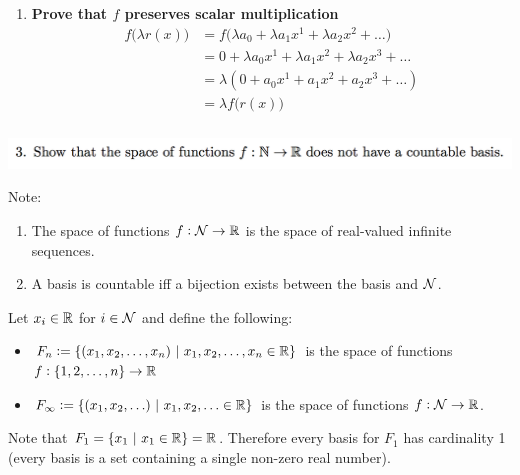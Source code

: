 \begin{enumerate}
\item \textbf{Prove that $f$ preserves scalar multiplication}
  \begin{align*}
    f\Big(\lambda r(x)\Big)
    &= f\Big(\lambda a_0 + \lambda a_1x^1 + \lambda a_2x^2 + \ldots \Big) \\
    &= 0 + \lambda a_0x^1 + \lambda a_1x^2 + \lambda a_2x^3 + \ldots \\
    &= \lambda(0 + a_0x^1 + a_1x^2 + a_2x^3 + \ldots) \\
    &= \lambda f\Big(r(x)\Big)
  \end{align*}


\end{enumerate}

\newpage
\subsubsection{} %
\begin{mdframed}
  \includegraphics[width=400pt]{img/linear-algebra-a0-1-3.png}\\
\end{mdframed}

Note:
\begin{enumerate}
\item The space of functions $f:\mathcal{N} \to \mathbb{R}$ is the space of real-valued
  infinite sequences.
\item A basis is countable iff a bijection exists between the basis and $\mathcal{N}$.
\end{enumerate}


Let $x_i \in \mathbb{R}$ for
$i \in \mathcal{N}$ and define the following:
\begin{itemize}
\item $F_n := \{(x_1, x_2, \ldots, x_n) ~|~ x_1, x_2, \ldots, x_n \in \mathbb{R}\}$ is
  the space of functions\\$f:\{1,2, \ldots, n\} \to \mathbb{R}$
\item $F_\infty := \{(x_1, x_2, \ldots) ~|~ x_1, x_2, \ldots \in \mathbb{R}\}$ is the
  space of functions $f:\mathcal{N} \to \mathbb{R}$.
\end{itemize}

Note that $F_1 = \{x_1 ~|~ x_1 \in \mathbb{R}\} = \mathbb{R}$. Therefore every basis for $F_1$ has cardinality
1 (every basis is a set containing a single non-zero real number).

